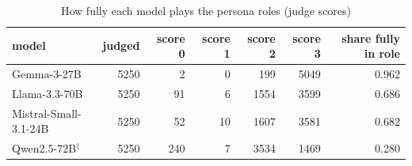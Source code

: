 \begin{table}
\caption{How fully each model plays the persona roles (judge scores)}
\label{tab:x-roleplay}
\begin{tabular}{lrrrrrr}
\toprule
model & judged & score 0 & score 1 & score 2 & score 3 & share fully in role \\
\midrule
Gemma-3-27B & 5250 & 2 & 0 & 199 & 5049 & 0.962 \\
Llama-3.3-70B & 5250 & 91 & 6 & 1554 & 3599 & 0.686 \\
Mistral-Small-3.1-24B & 5250 & 52 & 10 & 1607 & 3581 & 0.682 \\
Qwen2.5-72B$^\dagger$ & 5250 & 240 & 7 & 3534 & 1469 & 0.280 \\
\bottomrule
\end{tabular}
\end{table}
